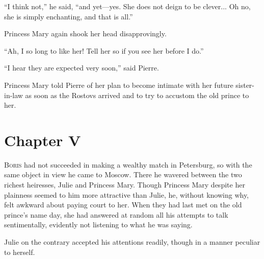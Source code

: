 ``I think not,'' he said, ``and yet---yes. She does not deign to
be clever... Oh no, she is simply enchanting, and that is all.''

Princess Mary again shook her head disapprovingly.

``Ah, I so long to like her! Tell her so if you see her before I
do.''

``I hear they are expected very soon,'' said Pierre.

Princess Mary told Pierre of her plan to become intimate with her
future sister-in-law as soon as the Rostovs arrived and to try to
accustom the old prince to her.


\chapter*{Chapter V}
\ifaudio     
{} 
\fi

\lettrine[lines=2, loversize=0.3, lraise=0]{\initfamily B}{oris}
had not succeeded in making a wealthy match in Petersburg,
so with the same object in view he came to Moscow. There he
wavered between the two richest heiresses, Julie and Princess
Mary. Though Princess Mary despite her plainness seemed to him
more attractive than Julie, he, without knowing why, felt awkward
about paying court to her. When they had last met on the old
prince's name day, she had answered at random all his attempts to
talk sentimentally, evidently not listening to what he was
saying.

Julie on the contrary accepted his attentions readily, though in
a manner peculiar to herself.

